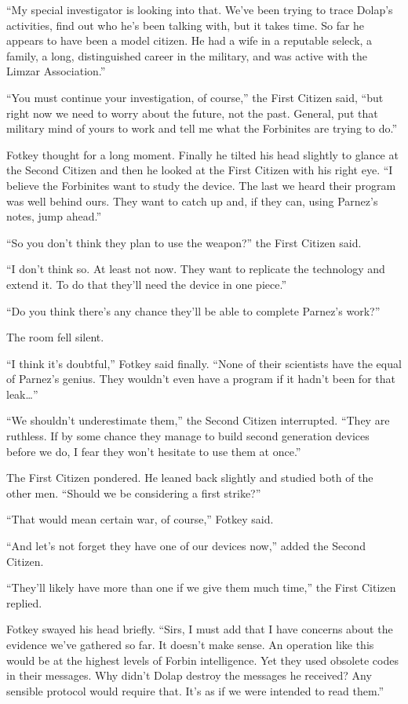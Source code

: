 ``My special investigator is looking into that. We've been trying to trace Dolap's activities,
find out who he's been talking with, but it takes time. So far he appears to have been a model
citizen. He had a wife in a reputable seleck, a family, a long, distinguished career in the
military, and was active with the Limzar Association.''

``You must continue your investigation, of course,'' the First Citizen said, ``but right now we
need to worry about the future, not the past. General, put that military mind of yours to work
and tell me what the Forbinites are trying to do.''

Fotkey thought for a long moment. Finally he tilted his head slightly to glance at the Second
Citizen and then he looked at the First Citizen with his right eye. ``I believe the Forbinites
want to study the device. The last we heard their program was well behind ours. They want to
catch up and, if they can, using Parnez's notes, jump ahead.''

``So you don't think they plan to use the weapon?'' the First Citizen said.

``I don't think so. At least not now. They want to replicate the technology and extend it. To do
that they'll need the device in one piece.''

``Do you think there's any chance they'll be able to complete Parnez's work?''

The room fell silent.

``I think it's doubtful,'' Fotkey said finally. ``None of their scientists have the equal of
Parnez's genius. They wouldn't even have a program if it hadn't been for that leak\ldots''

``We shouldn't underestimate them,'' the Second Citizen interrupted. ``They are ruthless. If by
some chance they manage to build second generation devices before we do, I fear they won't
hesitate to use them at once.''

The First Citizen pondered. He leaned back slightly and studied both of the other men. ``Should
we be considering a first strike?''

``That would mean certain war, of course,'' Fotkey said.

``And let's not forget they have one of our devices now,'' added the Second Citizen.

``They'll likely have more than one if we give them much time,'' the First Citizen replied.

Fotkey swayed his head briefly. ``Sirs, I must add that I have concerns about the evidence we've
gathered so far. It doesn't make sense. An operation like this would be at the highest levels of
Forbin intelligence. Yet they used obsolete codes in their messages. Why didn't Dolap destroy
the messages he received? Any sensible protocol would require that. It's as if we were intended
to read them.''

